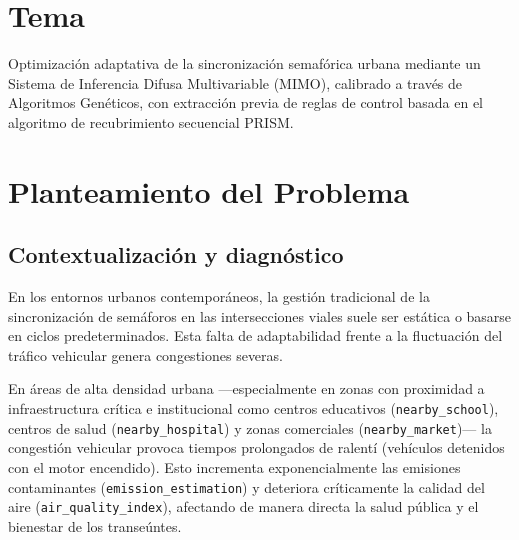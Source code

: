 \documentclass[12pt,a4paper]{article}
\begin{document}
\newpage


\tableofcontents

\newpage


\section{Tema}

Optimización adaptativa de la sincronización semafórica urbana mediante un
Sistema de Inferencia Difusa Multivariable (MIMO), calibrado a través de
Algoritmos Genéticos, con extracción previa de reglas de control basada en
el algoritmo de recubrimiento secuencial PRISM.


\section{Planteamiento del Problema}

\subsection{Contextualización y diagnóstico}

En los entornos urbanos contemporáneos, la gestión tradicional de la
sincronización de semáforos en las intersecciones viales suele ser
estática o basarse en ciclos predeterminados. Esta falta de adaptabilidad
frente a la fluctuación del tráfico vehicular genera congestiones severas.

En áreas de alta densidad urbana ---especialmente en zonas con proximidad
a infraestructura crítica e institucional como centros educativos
(\texttt{nearby\_school}), centros de salud (\texttt{nearby\_hospital}) y
zonas comerciales (\texttt{nearby\_market})--- la congestión vehicular
provoca tiempos prolongados de ralentí (vehículos detenidos con el motor
encendido). Esto incrementa exponencialmente las emisiones contaminantes
(\texttt{emission\_estimation}) y deteriora críticamente la calidad del
aire (\texttt{air\_quality\_index}), afectando de manera directa la salud
pública y el bienestar de los transeúntes.
\end{document}
